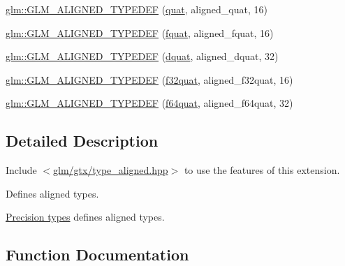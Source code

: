 \begin{DoxyCompactItemize}
\item 
\hyperlink{group__gtx__type__aligned_gafd945a8ea86b042aba410e0560df9a3d}{glm\+::\+G\+L\+M\+\_\+\+A\+L\+I\+G\+N\+E\+D\+\_\+\+T\+Y\+P\+E\+D\+EF} (\hyperlink{namespaceglm_ac1f6a5957091b849730ea6f05a6b7ad6}{quat}, aligned\+\_\+quat, 16)
\item 
\hyperlink{group__gtx__type__aligned_gad8c4bfacff70e57dc8303634c8bfce35}{glm\+::\+G\+L\+M\+\_\+\+A\+L\+I\+G\+N\+E\+D\+\_\+\+T\+Y\+P\+E\+D\+EF} (\hyperlink{namespaceglm_aa95d73f08018f3864c6ae08dbf1c59f2}{fquat}, aligned\+\_\+fquat, 16)
\item 
\hyperlink{group__gtx__type__aligned_gaabc28c84a3288b697605d4688686f9a9}{glm\+::\+G\+L\+M\+\_\+\+A\+L\+I\+G\+N\+E\+D\+\_\+\+T\+Y\+P\+E\+D\+EF} (\hyperlink{namespaceglm_a49693161673a003b4a8fd4d8b15b0b7b}{dquat}, aligned\+\_\+dquat, 32)
\item 
\hyperlink{group__gtx__type__aligned_ga1ed8aeb5ca67fade269a46105f1bf273}{glm\+::\+G\+L\+M\+\_\+\+A\+L\+I\+G\+N\+E\+D\+\_\+\+T\+Y\+P\+E\+D\+EF} (\hyperlink{group__gtc__type__precision_gac59c4d798396552e4bbb866b3d8a2f18}{f32quat}, aligned\+\_\+f32quat, 16)
\item 
\hyperlink{group__gtx__type__aligned_ga95cc03b8b475993fa50e05e38e203303}{glm\+::\+G\+L\+M\+\_\+\+A\+L\+I\+G\+N\+E\+D\+\_\+\+T\+Y\+P\+E\+D\+EF} (\hyperlink{group__gtc__type__precision_ga5b54d7b36fbee5e271f73e6ed74e7172}{f64quat}, aligned\+\_\+f64quat, 32)
\end{DoxyCompactItemize}


\subsection{Detailed Description}
Include $<$\hyperlink{gtx_2type__aligned_8hpp}{glm/gtx/type\+\_\+aligned.\+hpp}$>$ to use the features of this extension.

Defines aligned types.

\hyperlink{group__core__precision}{Precision types} defines aligned types. 

\subsection{Function Documentation}
\mbox{\label{group__gtx__type__aligned_gab5cd5c5fad228b25c782084f1cc30114}} 

